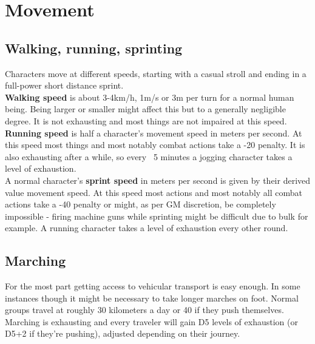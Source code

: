 \documentclass[12pt,a4paper,openany,usenames,dvipsnames]{book}
\begin{document}
	\chapter{Movement}
	\section{Walking, running, sprinting}
	Characters move at different speeds, starting with a casual stroll and ending in a full-power short distance sprint.\\
	\textbf{Walking speed} is about 3-4km/h, 1m/s or 3m per turn for a normal human being. Being larger or smaller might affect this but to a generally negligible degree. It is not exhausting and most things are not impaired at this speed.\\
	\textbf{Running speed} is half a character’s movement speed in meters per second. At this speed most things and most notably combat actions take a -20 penalty. It is also exhausting after a while, so every ~5 minutes a jogging character takes a level of exhaustion.\\
	A normal character’s \textbf{sprint speed} in meters per second is given by their derived value movement speed. At this speed most actions and most notably all combat actions take a -40 penalty or might, as per GM discretion, be completely impossible - firing machine guns while sprinting might be difficult due to bulk for example. A running character takes a level of exhaustion every other round.
	\section{Marching}
	For the most part getting access to vehicular transport is easy enough. In some instances though it might be necessary to take longer marches on foot. Normal groups travel at roughly 30 kilometers a day or 40 if they push themselves. Marching is exhausting and every traveler will gain D5 levels of exhaustion (or D5+2 if they're pushing), adjusted depending on their journey.
\end{document}
